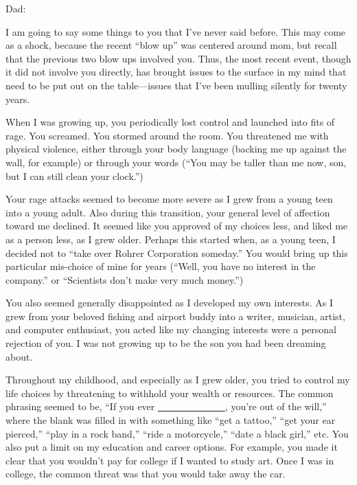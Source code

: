 \documentclass[12pt]{letter}
\begin{document}
\begin{letter}{}

\signature{Jason}


\opening{Dad:}

I am going to say some things to you that I've never said before.  This may come as a shock, because the recent ``blow up'' was centered around mom, but recall that the previous two blow ups involved you.  Thus, the most recent event, though it did not involve you directly, has brought issues to the surface in my mind that need to be put out on the table---issues that I've been mulling silently for twenty years.

\vspace{.25in}

When I was growing up, you periodically lost control and launched into fits of rage.  You screamed.  You stormed around the room.  You threatened me with physical violence, either through your body language (backing me up against the wall, for example) or through your words (``You may be taller than me now, son, but I can still clean your clock.'')

Your rage attacks seemed to become more severe as I grew from a young teen into a young adult.  Also during this transition, your general level of affection toward me declined.  It seemed like you approved of my choices less, and liked me as a person less, as I grew older.  Perhaps this started when, as a young teen, I decided not to ``take over Rohrer Corporation someday.''  You would bring up this particular mis-choice of mine for years (``Well, you have no interest in the company.'' or ``Scientists don't make very much money.'')

You also seemed generally disappointed as I developed my own interests.  As I grew from your beloved fishing and airport buddy into a writer, musician, artist, and computer enthusiast, you acted like my changing interests were a personal rejection of you.  I was not growing up to be the son you had been dreaming about.

Throughout my childhood, and especially as I grew older, you tried to control my life choices by threatening to withhold your wealth or resources.  The common phrasing seemed to be, ``If you ever \underline{~~~~~~~~~~~~~~}, you're out of the will,'' where the blank was filled in with something like ``get a tattoo,'' ``get your ear pierced,'' ``play in a rock band,'' ``ride a motorcycle,'' ``date a black girl,'' etc.  You also put a limit on my education and career options.  For example, you made it clear that you wouldn't pay for college if I wanted to study art.  Once I was in college, the common threat was that you would take away the car.


\end{letter}
\end{document}
